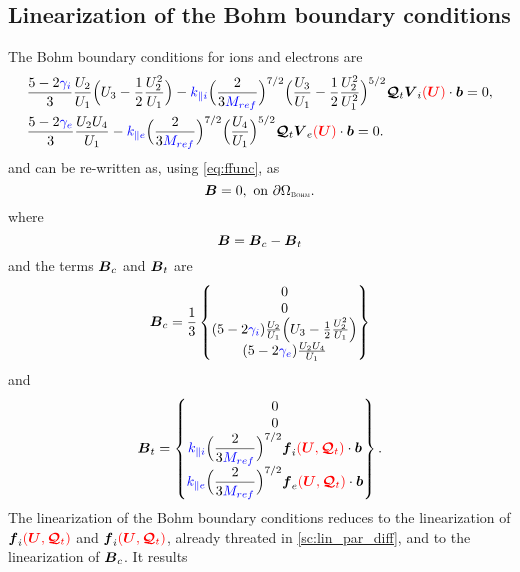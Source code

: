 \documentclass[a4paper,10pt]{article}
\newcommand{\bm}[1]{\text{\boldmath$#1$\unboldmath}}
\renewcommand{\b}{\bm{b}}
\newcommand{\DiscFunc}[1]{\bm{#1}}
\newcommand{\SecOrdTens}[1]{\bm{\mathcal{#1}}}
\renewcommand{\u}{\DiscFunc{U}}
\newcommand{\G}{\SecOrdTens{Q}}
\newcommand{\Gt}{\G_t}
\newcommand{\B}{\bm{B}}
\newcommand{\nd}[1]{{\color{blue} #1\color{black}}} %
\newcommand{\fo}[1]{{ \color{red} ( #1 )\color{black} }} %
\newcommand{\vs}[1]{\scriptscriptstyle{\textsc{#1}}}
\def\Mref{\nd{M_{ref}}}
\def\kpai{\nd{k_{\parallel i}}}
\def\kpae{\nd{k_{\parallel e}}}
\begin{document}
\subsection{Linearization of the Bohm boundary conditions}\label{sc:lin_bohm}
The Bohm boundary conditions for ions and electrons are
\begin{equation*}
 \begin{aligned}
 &\frac{5-2\nd{\gamma_i}}{3}\frac{U_2}{U_1}\Big( U_3 - \frac{1}{2}\frac{U_2^2}{U_1} \Big)-\kpai \Big(\dfrac{2}{3 \Mref}\Big)^{7/2}\Big(\dfrac{U_3}{U_1}- \dfrac{1}{2}\dfrac{U_2^2}{U_1^2}\Big)^{5/2}\Gt  \bm{V}_i\fo{\u} \cdot \b= 0,\\
  & \frac{5-2\nd{\gamma_e}}{3}\frac{U_2 U_4}{U_1}- \kpae \Big(\dfrac{2}{3 \Mref}\Big)^{7/2}\Big(\dfrac{U_4}{U_1}\Big)^{5/2}\Gt  \bm{V}_e\fo{\u} \cdot \b  = 0.
 \end{aligned}
\end{equation*}
and can be re-written as, using \eqref{eq:ffunc},
as 
\begin{equation*}
 \B=0, \text{ on } \partial \Omega_{\vs{Bohm}}.
\end{equation*}
where
\begin{equation*}
  \B = \B_c - \B_t
\end{equation*}
and the terms $ \B_c $ and $ \B_t$ are 
\begin{equation*}
  \B_c = \frac{1}{3} \begin{Bmatrix}
                     0 \\                    
                     0\\
                    (5-2\nd{\gamma_i})\frac{U_2}{U_1}\Big( U_3 - \frac{1}{2}\frac{U_2^2}{U_1} \Big)  \\
                    (5-2\nd{\gamma_e})\frac{U_2 U_4}{U_1}
            \end{Bmatrix} 
\end{equation*}
and 
\begin{equation*}
  \B_t = \begin{Bmatrix}
                     0 \\                    
                     0\\
                    \kpai \Big(\dfrac{2}{3 \Mref}\Big)^{7/2} \bm{f}_i\fo{\u,\Gt} \cdot \b  \\
                    \kpae \Big(\dfrac{2}{3 \Mref}\Big)^{7/2} \bm{f}_e\fo{\u,\Gt} \cdot \b
            \end{Bmatrix} .
\end{equation*}
The linearization of the Bohm boundary conditions reduces to the linearization of $\bm{f}_i\fo{\u,\Gt}$ and $\bm{f}_i\fo{\u,\Gt}$, already threated in \ref{sc:lin_par_diff}, and to the linearization of $\B_c$. It results 
\end{document}
